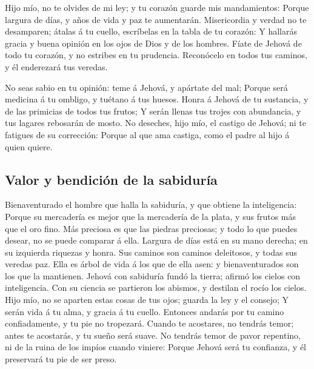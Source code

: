  Hijo mío, no te olvides de mi ley; y tu corazón guarde mis
mandamientos:  Porque largura de días, y años de vida y paz
te aumentarán.  Misericordia y verdad no te desamparen;
átalas á tu cuello, escríbelas en la tabla de tu corazón:  Y
hallarás gracia y buena opinión en los ojos de Dios y de los hombres.
 Fíate de Jehová de todo tu corazón, y no estribes en tu
prudencia.  Reconócelo en todos tus caminos, y él enderezará
tus veredas.

 No seas sabio en tu opinión: teme á Jehová, y apártate del
mal;  Porque será medicina á tu ombligo, y tuétano á tus
huesos.  Honra á Jehová de tu sustancia, y de las primicias
de todos tus frutos;  Y serán llenas tus trojes con
abundancia, y tus lagares rebosarán de mosto.  No deseches,
hijo mío, el castigo de Jehová; ni te fatigues de su corrección:
 Porque al que ama castiga, como el padre al hijo á quien
quiere.

\hypertarget{valor-y-bendiciuxf3n-de-la-sabiduruxeda}{%
\subsection{Valor y bendición de la
sabiduría}\label{valor-y-bendiciuxf3n-de-la-sabiduruxeda}}

 Bienaventurado el hombre que halla la sabiduría, y que
obtiene la inteligencia:  Porque su mercadería es mejor que
la mercadería de la plata, y sus frutos más que el oro fino.
 Más preciosa es que las piedras preciosas; y todo lo que
puedes desear, no se puede comparar á ella.  Largura de
días está en su mano derecha; en su izquierda riquezas y honra.
 Sus caminos son caminos deleitosos, y todas sus veredas
paz.  Ella es árbol de vida á los que de ella asen: y
bienaventurados son los que la mantienen.  Jehová con
sabiduría fundó la tierra; afirmó los cielos con inteligencia.
 Con su ciencia se partieron los abismos, y destilan el
rocío los cielos.  Hijo mío, no se aparten estas cosas de
tus ojos; guarda la ley y el consejo;  Y serán vida á tu
alma, y gracia á tu cuello.  Entonces andarás por tu camino
confiadamente, y tu pie no tropezará.  Cuando te acostares,
no tendrás temor; antes te acostarás, y tu sueño será suave.
 No tendrás temor de pavor repentino, ni de la ruina de los
impíos cuando viniere:  Porque Jehová será tu confianza, y
él preservará tu pie de ser preso.

